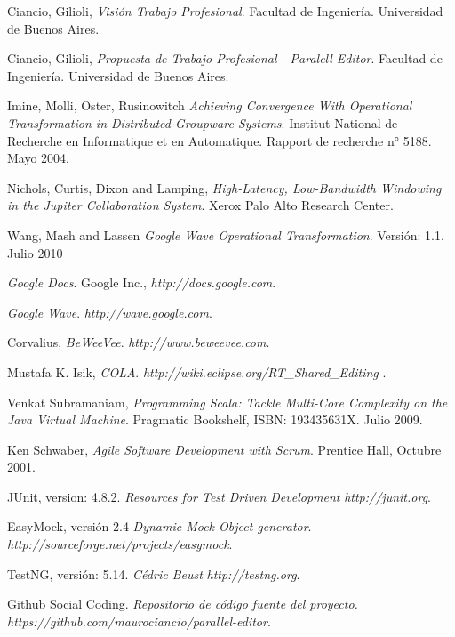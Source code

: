 \documentclass[12pt,a4paper]{article}
\begin{document}
\newpage
\begin{thebibliography}{9}
	Ciancio, Gilioli,
	\emph{Visión Trabajo Profesional}.
	Facultad de Ingeniería.
	Universidad de Buenos Aires. 

	Ciancio, Gilioli,
	\emph{Propuesta de Trabajo Profesional - Paralell Editor}.
	Facultad de Ingeniería.
	Universidad de Buenos Aires. 

	Imine, Molli, Oster, Rusinowitch
	\emph{Achieving Convergence With Operational Transformation in Distributed Groupware Systems}.
	Institut National de Recherche en Informatique et en Automatique.
	Rapport de recherche n° 5188. 
	Mayo 2004.

	Nichols, Curtis, Dixon and Lamping,
	\emph{High-Latency, Low-Bandwidth Windowing in the Jupiter Collaboration System}.
	Xerox Palo Alto Research Center.

	Wang, Mash and Lassen
	\emph{Google Wave Operational Transformation}.
	Versión: 1.1.
	Julio 2010
	
	\emph{Google Docs}. 
	Google Inc., 
	\textsl{http://docs.google.com}.
	
	\emph{Google Wave}. 
	\textsl{http://wave.google.com}.

	Corvalius,
	\emph{BeWeeVee}. 
	\textsl{http://www.beweevee.com}.
	
	Mustafa K. Isik,
	\emph{COLA}. 
	\textsl{ http://wiki.eclipse.org/RT\_Shared\_Editing }.

	Venkat Subramaniam,
	\emph{Programming Scala: Tackle Multi-Core Complexity on the Java Virtual Machine}.
	Pragmatic Bookshelf, ISBN: 193435631X.
	Julio 2009.

	Ken Schwaber,
	\emph{Agile Software Development with Scrum}.
	Prentice Hall, 
	Octubre 2001.

	JUnit, version: 4.8.2.
	\emph{Resources for Test Driven Development} 
	\textsl{http://junit.org}.

	EasyMock, versión 2.4
	\emph{Dynamic Mock Object generator}. \\
	\textsl{http://sourceforge.net/projects/easymock}.

	TestNG, versión: 5.14.
	\emph{Cédric Beust} 
	\textsl{http://testng.org}.

	Github Social Coding.
	\emph{Repositorio de código fuente del proyecto.} 
	\textsl{https://github.com/maurociancio/parallel-editor}.

		
\end{thebibliography}
\end{document}
